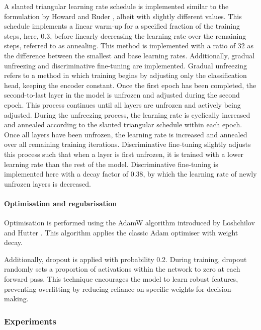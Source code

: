 \documentclass[12pt]{report}
\begin{document}
A slanted triangular learning rate schedule is implemented similar to the formulation by Howard and Ruder \citeyear{Howard2018}, albeit with slightly different values.
This schedule implements a linear warm-up for a specified fraction of the training steps, here, 0.3, before linearly decreasing the learning rate over the remaining steps, referred to as annealing.
This method is implemented with a ratio of 32 as the difference between the smallest and base learning rates.
Additionally, gradual unfreezing and discriminative fine-tuning are implemented.
Gradual unfreezing refers to a method in which training begins by adjusting only the classification head, keeping the encoder constant.
Once the first epoch has been completed, the second-to-last layer in the model is unfrozen and adjusted during the second epoch.
This process continues until all layers are unfrozen and actively being adjusted.
During the unfreezing process, the learning rate is cyclically increased and annealed according to the slanted triangular schedule within each epoch.
Once all layers have been unfrozen, the learning rate is increased and annealed over all remaining training iterations.
Discriminative fine-tuning slightly adjusts this process such that when a layer is first unfrozen, it is trained with a lower learning rate than the rest of the model.
Discriminative fine-tuning is implemented here with a decay factor of 0.38, by which the learning rate of newly unfrozen layers is decreased.

\paragraph*{Optimisation and regularisation}
Optimisation is performed using the AdamW algorithm introduced by Loshchilov and Hutter \citeyear{AdamW}.
This algorithm applies the classic Adam optimiser \cite{Adam} with weight decay.

Additionally, dropout is applied with probability 0.2.
During training, dropout randomly sets a proportion of activations within the network to zero at each forward pass.
This technique encourages the model to learn robust features, preventing overfitting by reducing reliance on specific weights for decision-making.

\subsubsection*{Experiments}
\end{document}
